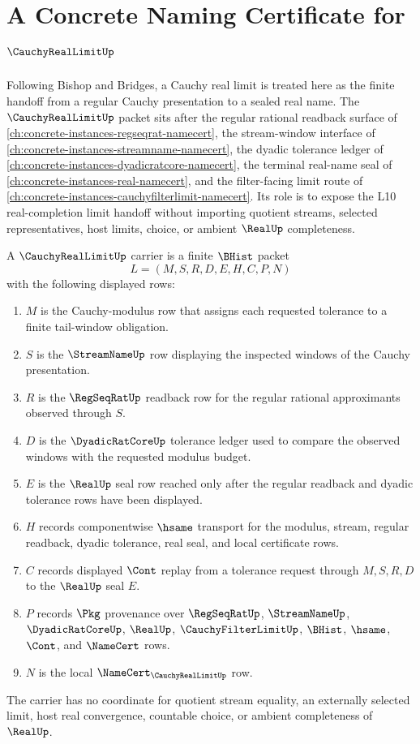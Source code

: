\chapter{A Concrete Naming Certificate for $\CauchyRealLimitUp$}
\label{ch:concrete-instances-cauchy-real-limit-namecert}

Following Bishop and Bridges, a Cauchy real limit is treated here as the finite handoff from a regular Cauchy presentation to a sealed real name. The $\CauchyRealLimitUp$ packet sits after the regular rational readback surface of \autoref{ch:concrete-instances-regseqrat-namecert}, the stream-window interface of \autoref{ch:concrete-instances-streamname-namecert}, the dyadic tolerance ledger of \autoref{ch:concrete-instances-dyadicratcore-namecert}, the terminal real-name seal of \autoref{ch:concrete-instances-real-namecert}, and the filter-facing limit route of \autoref{ch:concrete-instances-cauchyfilterlimit-namecert}. Its role is to expose the L10 real-completion limit handoff without importing quotient streams, selected representatives, host limits, choice, or ambient $\RealUp$ completeness.

\begin{definition}
\label{def:cauchy-real-limit-carrier}
A $\CauchyRealLimitUp$ carrier is a finite $\BHist$ packet
$$
L=(M,S,R,D,E,H,C,P,N)
$$
with the following displayed rows:
\begin{enumerate}
\item $M$ is the Cauchy-modulus row that assigns each requested tolerance to a finite tail-window obligation.
\item $S$ is the $\StreamNameUp$ row displaying the inspected windows of the Cauchy presentation.
\item $R$ is the $\RegSeqRatUp$ readback row for the regular rational approximants observed through $S$.
\item $D$ is the $\DyadicRatCoreUp$ tolerance ledger used to compare the observed windows with the requested modulus budget.
\item $E$ is the $\RealUp$ seal row reached only after the regular readback and dyadic tolerance rows have been displayed.
\item $H$ records componentwise $\hsame$ transport for the modulus, stream, regular readback, dyadic tolerance, real seal, and local certificate rows.
\item $C$ records displayed $\Cont$ replay from a tolerance request through $M,S,R,D$ to the $\RealUp$ seal $E$.
\item $P$ records $\Pkg$ provenance over $\RegSeqRatUp$, $\StreamNameUp$, $\DyadicRatCoreUp$, $\RealUp$, $\CauchyFilterLimitUp$, $\BHist$, $\hsame$, $\Cont$, and $\NameCert$ rows.
\item $N$ is the local $\NameCert_{\CauchyRealLimitUp}$ row.
\end{enumerate}
The carrier has no coordinate for quotient stream equality, an externally selected limit, host real convergence, countable choice, or ambient completeness of $\RealUp$.
\end{definition}

